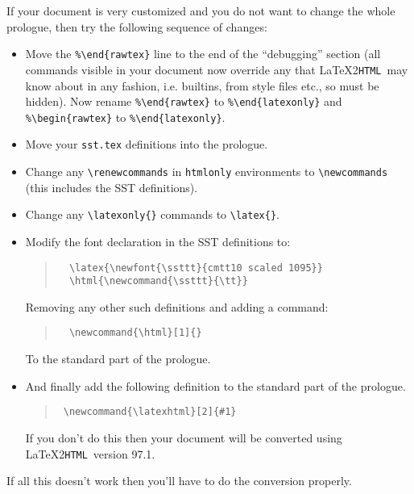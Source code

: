 \documentclass[twoside,11pt]{article}
\newcommand{\latex}[1]{#1}
\newcommand{\html}[1]{}
\newcommand{\latexhtml}[2]{#1}
\newcommand{\latextohtml}{\LaTeX2\texttt{HTML}}
\renewcommand{\_}{\texttt{\symbol{95}}}
\begin{document}
If your document is very customized and you do not want to change the
whole prologue, then try the following sequence of changes:
\begin{itemize}
\item Move the \verb#%#\verb#\end{rawtex}# line to the end of the
      ``debugging'' section (all commands visible in your document now
      override any that \latextohtml\ may know about in any fashion,
      i.e. builtins, from style files etc., so must be hidden). Now
      rename \verb#%#\verb#\end{rawtex}# to \verb#%#\verb#\end{latexonly}#
      and \verb#%#\verb#\begin{rawtex}# to \verb#%#\verb#\end{latexonly}#.
\item Move your \verb#sst.tex# definitions into the prologue.
\item Change any \verb#\renewcommands# in \verb#htmlonly# environments
      to \verb#\newcommands# (this includes the SST definitions).
\item Change any \verb#\latexonly{}# commands to \verb#\latex{}#.
\item Modify the font declaration in the SST definitions to:
\begin{quote}
\begin{verbatim}
  \latex{\newfont{\ssttt}{cmtt10 scaled 1095}}
  \html{\newcommand{\ssttt}{\tt}}
\end{verbatim}
\end{quote}
Removing any other such definitions and adding a command:
\begin{quote}
\begin{verbatim}
  \newcommand{\html}[1]{}
\end{verbatim}
\end{quote}
To the standard part of the prologue.
\item And finally add the following definition to the standard part of 
      the prologue.
\begin{quote}
\begin{verbatim}
 \newcommand{\latexhtml}[2]{#1}
\end{verbatim}
\end{quote}
If you don't do this then your document will be converted using
\latextohtml\ version 97.1.
\end{itemize}
If all this doesn't work then you'll have to do the conversion properly.
\end{document}
